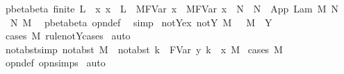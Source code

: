 \begin{isabellebody}
{\isafoldproof}%
%
\isadelimproof
\isanewline
%
\endisadelimproof
\isanewline
{}\isamarkupfalse%
\ pbeta{\isacharunderscore}beta{\isacharprime}{\isacharcolon}\ {\isachardoublequoteopen}finite\ L\ {\isasymLongrightarrow}\ {\isacharparenleft}{\isasymAnd}x{\isachardot}\ x\ {\isasymnotin}\ L\ {\isasymLongrightarrow}\ M{\isacharcircum}{\isacharparenleft}FVar\ x{\isacharparenright}\ {\isasymggreater}\ M{\isacharprime}{\isacharcircum}{\isacharparenleft}FVar\ x{\isacharparenright}{\isacharparenright}\ {\isasymLongrightarrow}\ N\ {\isasymggreater}\ N{\isacharprime}\ {\isasymLongrightarrow}\ App\ {\isacharparenleft}Lam\ M{\isacharparenright}\ N\ {\isasymggreater}\ {\isacharbraceleft}{}\ {\isasymrightarrow}\ N{\isacharprime}{\isacharbraceright}\ M{\isacharprime}{\isachardoublequoteclose}\ \isanewline
%
\isadelimproof
%
\endisadelimproof
%
\isatagproof
{}\isamarkupfalse%
\ pbeta{\isachardot}beta\ opn{\isacharprime}{\isacharunderscore}def\ \isamarkupfalse%
\ simp%
\endisatagproof
{\isafoldproof}%
%
\isadelimproof
\isanewline
%
\endisadelimproof
\isanewline
{}\isamarkupfalse%
\ not{\isacharunderscore}Y{\isacharunderscore}ex{\isacharcolon}\ {\isachardoublequoteopen}{\isasymnot}{\isacharparenleft}not{\isacharunderscore}Y\ M{\isacharparenright}\ {\isasymLongrightarrow}\ {\isasymexists}{\isasymsigma}{\isachardot}\ M\ {\isacharequal}\ Y\ {\isasymsigma}{\isachardoublequoteclose}\isanewline
%
\isadelimproof
%
\endisadelimproof
%
\isatagproof
{}\isamarkupfalse%
\ {\isacharparenleft}cases\ M\ rule{\isacharcolon}not{\isacharunderscore}Y{\isachardot}cases{\isacharparenright}\isanewline
{}\isamarkupfalse%
\ auto%
\endisatagproof
{\isafoldproof}%
%
\isadelimproof
\isanewline
%
\endisadelimproof
\isanewline
{}\isamarkupfalse%
\ not{\isacharunderscore}abst{\isacharunderscore}simp{\isacharcolon}\ {\isachardoublequoteopen}not{\isacharunderscore}abst\ M\ {\isasymLongrightarrow}\ not{\isacharunderscore}abst\ {\isacharbraceleft}k\ {\isasymrightarrow}\ FVar\ y{\isacharbraceright}\ {\isacharbraceleft}k\ {\isacharless}{\isacharminus}\ x{\isacharbraceright}\ M{\isachardoublequoteclose}\isanewline
%
\isadelimproof
%
\endisadelimproof
%
\isatagproof
{}\isamarkupfalse%
\ {\isacharparenleft}cases\ M{\isacharparenright}\isanewline
{}\isamarkupfalse%
\ opn{\isacharprime}{\isacharunderscore}def\ opn{\isachardot}simps\isanewline
{}\isamarkupfalse%
\ auto%
\endisatagproof
{\isafoldproof}%
%
\isadelimproof
\isanewline
%
\endisadelimproof

\end{isabellebody}
